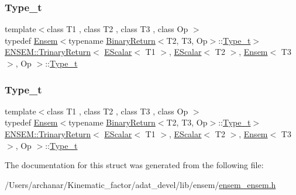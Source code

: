 \subsubsection{\texorpdfstring{Type\_t}{Type\_t}\hspace{0.1cm}{\footnotesize\ttfamily [1/2]}}
{\footnotesize\ttfamily template$<$class T1 , class T2 , class T3 , class Op $>$ \\
typedef \mbox{\hyperlink{classENSEM_1_1Ensem}{Ensem}}$<$typename \mbox{\hyperlink{structENSEM_1_1BinaryReturn}{Binary\+Return}}$<$T2, T3, Op$>$\+::\mbox{\hyperlink{structENSEM_1_1TrinaryReturn_3_01EScalar_3_01T1_01_4_00_01EScalar_3_01T2_01_4_00_01Ensem_3_01T3_01_4_00_01Op_01_4_ae31d88575287f33c17235b01284dba5e}{Type\+\_\+t}}$>$ \mbox{\hyperlink{structENSEM_1_1TrinaryReturn}{E\+N\+S\+E\+M\+::\+Trinary\+Return}}$<$ \mbox{\hyperlink{classENSEM_1_1EScalar}{E\+Scalar}}$<$ T1 $>$, \mbox{\hyperlink{classENSEM_1_1EScalar}{E\+Scalar}}$<$ T2 $>$, \mbox{\hyperlink{classENSEM_1_1Ensem}{Ensem}}$<$ T3 $>$, Op $>$\+::\mbox{\hyperlink{structENSEM_1_1TrinaryReturn_3_01EScalar_3_01T1_01_4_00_01EScalar_3_01T2_01_4_00_01Ensem_3_01T3_01_4_00_01Op_01_4_ae31d88575287f33c17235b01284dba5e}{Type\+\_\+t}}}

\mbox{\label{structENSEM_1_1TrinaryReturn_3_01EScalar_3_01T1_01_4_00_01EScalar_3_01T2_01_4_00_01Ensem_3_01T3_01_4_00_01Op_01_4_ae31d88575287f33c17235b01284dba5e}} 
\subsubsection{\texorpdfstring{Type\_t}{Type\_t}\hspace{0.1cm}{\footnotesize\ttfamily [2/2]}}
{\footnotesize\ttfamily template$<$class T1 , class T2 , class T3 , class Op $>$ \\
typedef \mbox{\hyperlink{classENSEM_1_1Ensem}{Ensem}}$<$typename \mbox{\hyperlink{structENSEM_1_1BinaryReturn}{Binary\+Return}}$<$T2, T3, Op$>$\+::\mbox{\hyperlink{structENSEM_1_1TrinaryReturn_3_01EScalar_3_01T1_01_4_00_01EScalar_3_01T2_01_4_00_01Ensem_3_01T3_01_4_00_01Op_01_4_ae31d88575287f33c17235b01284dba5e}{Type\+\_\+t}}$>$ \mbox{\hyperlink{structENSEM_1_1TrinaryReturn}{E\+N\+S\+E\+M\+::\+Trinary\+Return}}$<$ \mbox{\hyperlink{classENSEM_1_1EScalar}{E\+Scalar}}$<$ T1 $>$, \mbox{\hyperlink{classENSEM_1_1EScalar}{E\+Scalar}}$<$ T2 $>$, \mbox{\hyperlink{classENSEM_1_1Ensem}{Ensem}}$<$ T3 $>$, Op $>$\+::\mbox{\hyperlink{structENSEM_1_1TrinaryReturn_3_01EScalar_3_01T1_01_4_00_01EScalar_3_01T2_01_4_00_01Ensem_3_01T3_01_4_00_01Op_01_4_ae31d88575287f33c17235b01284dba5e}{Type\+\_\+t}}}



The documentation for this struct was generated from the following file\+:\begin{DoxyCompactItemize}
\item 
/\+Users/archanar/\+Kinematic\+\_\+factor/adat\+\_\+devel/lib/ensem/\mbox{\hyperlink{lib_2ensem_2ensem__ensem_8h}{ensem\+\_\+ensem.\+h}}\end{DoxyCompactItemize}

